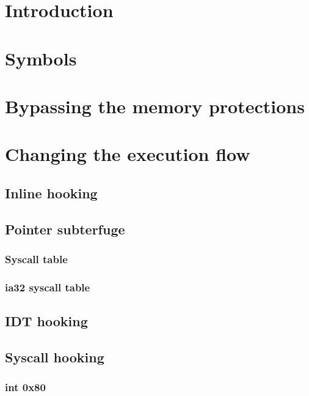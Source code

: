 \documentclass{article}
\begin{document}
\pagestyle{empty}
\titleAT
\tableofcontents

\section{Introduction}


\section{Symbols}


\section{Bypassing the memory protections}


\section{Changing the execution flow}
\subsection{Inline hooking}


\subsection{Pointer subterfuge}
\subsubsection{Syscall table}
\subsubsection{ia32 syscall table}

\subsection{IDT hooking}

\subsection{Syscall hooking}
\subsubsection{int 0x80}
\end{document}
